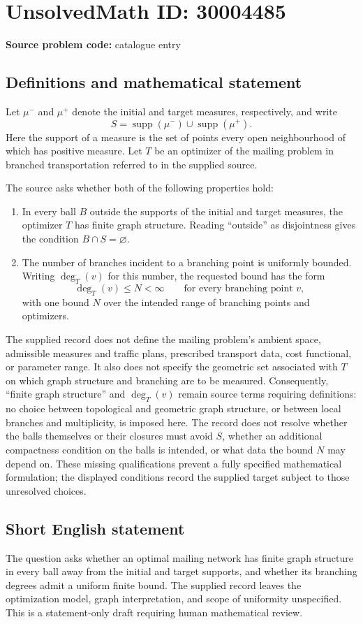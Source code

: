 \documentclass[11pt]{article}
\begin{document}
\section*{UnsolvedMath ID: 30004485}
\textbf{Source problem code:} catalogue entry
\subsection{Definitions and mathematical statement}
Let \(\mu^-\) and \(\mu^+\) denote the initial and target measures, respectively, and write
\[
S=\operatorname{supp}(\mu^-)\cup\operatorname{supp}(\mu^+).
\]
Here the support of a measure is the set of points every open neighbourhood of which has positive measure. Let \(T\) be an optimizer of the mailing problem in branched transportation referred to in the supplied source.

The source asks whether both of the following properties hold:
\begin{enumerate}
\item In every ball \(B\) outside the supports of the initial and target measures, the optimizer \(T\) has finite graph structure. Reading ``outside'' as disjointness gives the condition \(B\cap S=\varnothing\).
\item The number of branches incident to a branching point is uniformly bounded. Writing \(\deg_T(v)\) for this number, the requested bound has the form
\[
\deg_T(v)\leq N<\infty
\qquad\text{for every branching point }v,
\]
with one bound \(N\) over the intended range of branching points and optimizers.
\end{enumerate}

The supplied record does not define the mailing problem's ambient space, admissible measures and traffic plans, prescribed transport data, cost functional, or parameter range. It also does not specify the geometric set associated with \(T\) on which graph structure and branching are to be measured. Consequently, ``finite graph structure'' and \(\deg_T(v)\) remain source terms requiring definitions: no choice between topological and geometric graph structure, or between local branches and multiplicity, is imposed here. The record does not resolve whether the balls themselves or their closures must avoid \(S\), whether an additional compactness condition on the balls is intended, or what data the bound \(N\) may depend on. These missing qualifications prevent a fully specified mathematical formulation; the displayed conditions record the supplied target subject to those unresolved choices.
\subsection{Short English statement}
The question asks whether an optimal mailing network has finite graph structure in every ball away from the initial and target supports, and whether its branching degrees admit a uniform finite bound. The supplied record leaves the optimization model, graph interpretation, and scope of uniformity unspecified. This is a statement-only draft requiring human mathematical review.
\end{document}
